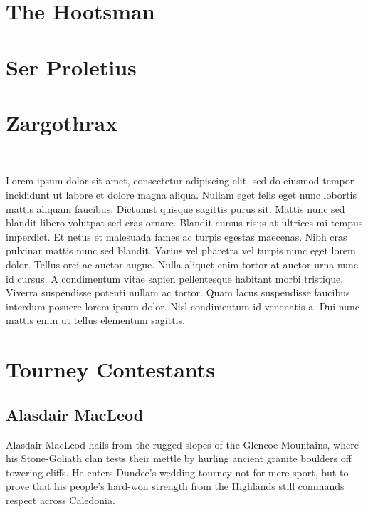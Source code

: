 \section*{The Hootsman}\label{char:Hootsman}%
%
\clearpage
\section*{Ser Proletius}\label{char:SerProletius}%
%
\clearpage
\section*{Zargothrax}\label{char:Zargothrax}%
\vspace*{-2.4\fontdimen6\font}\hfill\\\begin{multicols}{2}%
	{\noindent\entryfont Lorem ipsum dolor sit amet, consectetur adipiscing elit, sed do eiusmod tempor incididunt ut labore et dolore magna aliqua. Nullam eget felis eget nunc lobortis mattis aliquam faucibus. Dictumst quisque sagittis purus sit. Mattis nunc sed blandit libero volutpat sed cras ornare. Blandit cursus risus at ultrices mi tempus imperdiet. Et netus et malesuada fames ac turpis egestas maecenas. Nibh cras pulvinar mattis nunc sed blandit. Varius vel pharetra vel turpis nunc eget lorem dolor. Tellus orci ac auctor augue. Nulla aliquet enim tortor at auctor urna nunc id cursus. A condimentum vitae sapien pellentesque habitant morbi tristique. Viverra suspendisse potenti nullam ac tortor. Quam lacus suspendisse faucibus interdum posuere lorem ipsum dolor. Nisl condimentum id venenatis a. Dui nunc mattis enim ut tellus elementum sagittis.}
\end{multicols}%
%
\twocolumn
\clearpage
\section*{Tourney Contestants}%
\subsection{Alasdair MacLeod}\label{char:AlasdairMacLeod}
{\entryfont Alasdair MacLeod hails from the rugged slopes of the Glencoe Mountains, where his Stone-Goliath clan tests their mettle by hurling ancient granite boulders off towering cliffs. He enters Dundee's wedding tourney not for mere sport, but to prove that his people's hard-won strength from the Highlands still commands respect across Caledonia.}

\vfill\eject

